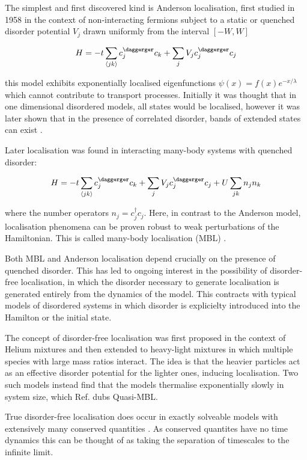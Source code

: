 The simplest and first discovered kind is Anderson localisation, first
studied in 1958 \textcite{anderson_absence_1958-1} in the context of
non-interacting fermions subject to a static or quenched disorder
potential \(V_j\) drawn uniformly from the interval \([-W,W]\)

\[
H = -t\sum_{\langle jk \rangle} c^\daggerger_j c_k + \sum_j V_j c_j^\daggerger c_j
\]

this model exhibits exponentially localised eigenfunctions
\(\psi(x) = f(x) e^{-x/\lambda}\) which cannot contribute to transport
processes. Initially it was thought that in one dimensional disordered
models, all states would be localised, however it was later shown that
in the presence of correlated disorder, bands of extended states can
exist
\autocite{izrailev_localization_1999,croy_anderson_2011,izrailev_anomalous_2012}.

Later localisation was found in interacting many-body systems with
quenched disorder:

\[
H = -t\sum_{\langle jk \rangle} c^\daggerger_j c_k + \sum_j V_j c_j^\daggerger c_j + U\sum_{jk} n_j n_k
\]

where the number operators \(n_j = c^\dagger_j c_j\). Here, in contrast
to the Anderson model, localisation phenomena can be proven robust to
weak perturbations of the Hamiltonian. This is called many-body
localisation (MBL) \textcite{imbrie_many-body_2016}.

Both MBL and Anderson localisation depend crucially on the presence of
quenched disorder. This has led to ongoing interest in the possibility
of disorder-free localisation, in which the disorder necessary to
generate localisation is generated entirely from the dynamics of the
model. This contracts with typical models of disordered systems in which
disorder is explicielty introduced into the Hamilton or the initial
state.

The concept of disorder-free localisation was first proposed in the
context of Helium mixtures \textcite{kagan1984localization} and then
extended to heavy-light mixtures in which multiple species with large
mass ratios interact. The idea is that the heavier particles act as an
effective disorder potential for the lighter ones, inducing
localisation. Two such models
\autocite{yao_quasi-many-body_2016,schiulaz_dynamics_2015} instead find
that the models thermalise exponentially slowly in system size, which
Ref. \textcite{yao_quasi-many-body_2016} dubs Quasi-MBL.

True disorder-free localisation does occur in exactly solveable models
with extensively many conserved quantities
\textcite{smith_disorder-free_2017}. As conserved quantites have no time
dynamics this can be thought of as taking the separation of timescales
to the infinite limit.

